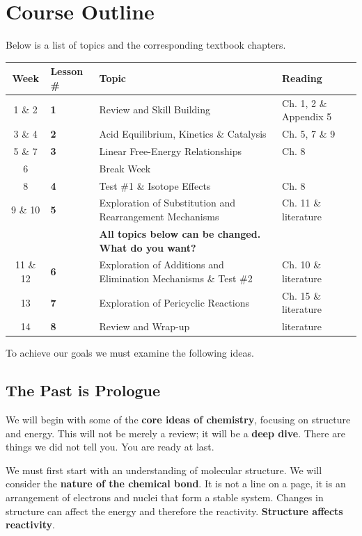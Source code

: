 \section{Course Outline}

Below is a list of topics and the corresponding textbook chapters.

\begin{table}[h]
\centering
\begin{tabular}{cllp{4cm}}
\toprule
Week & Lesson \# & Topic & Reading \\
\midrule
1 \& 2  & \textbf{1} & Review and Skill Building & Ch. 1, 2 \& Appendix 5 \\
3 \& 4  & \textbf{2} & Acid Equilibrium, Kinetics \& Catalysis & Ch. 5, 7 \& 9 \\
5 \& 7  & \textbf{3} & Linear Free-Energy Relationships & Ch. 8 \\
6        &           & Break Week & \\
8        & \textbf{4} & Test \#1 \& Isotope Effects & Ch. 8 \\
9 \& 10 & \textbf{5} & Exploration of Substitution and Rearrangement Mechanisms & Ch. 11 \& literature \\
          &           & \textbf{All topics below can be changed. What do you want?} & \\
11 \& 12 & \textbf{6} & Exploration of Additions and Elimination Mechanisms \& Test \#2 & Ch. 10 \& literature \\
13       & \textbf{7} & Exploration of Pericyclic Reactions & Ch. 15 \& literature \\
14       & \textbf{8} & Review and Wrap-up & literature \\
\bottomrule
\end{tabular}
\end{table}

\bigskip To achieve our goals we must examine the following ideas.

\subsection{The Past is Prologue}

We will begin with some of the \textbf{core ideas of chemistry}, focusing on structure and energy. This will not be merely a review; it will be a \textbf{deep dive}. There are things we did not tell you. You are ready at last.

We must first start with an understanding of molecular structure. We will consider the \textbf{nature of the chemical bond}. It is not a line on a page, it is an arrangement of electrons and nuclei that form a stable system. Changes in structure can affect the energy and therefore the reactivity. \textbf{Structure affects reactivity}.


